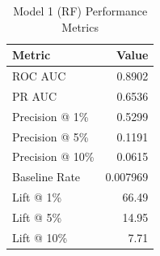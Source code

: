 \begin{table}[h]
\centering
\begin{tabular}{lr}
\toprule
Metric & Value \\
\midrule
ROC AUC & 0.8902 \\
PR AUC & 0.6536 \\
Precision @ 1\% & 0.5299 \\
Precision @ 5\% & 0.1191 \\
Precision @ 10\% & 0.0615 \\
Baseline Rate & 0.007969 \\
Lift @ 1\% & 66.49 \\
Lift @ 5\% & 14.95 \\
Lift @ 10\% & 7.71 \\
\bottomrule
\end{tabular}
\caption{Model 1 (RF) Performance Metrics}
\label{tab:model1_rf_metrics}
\end{table}
